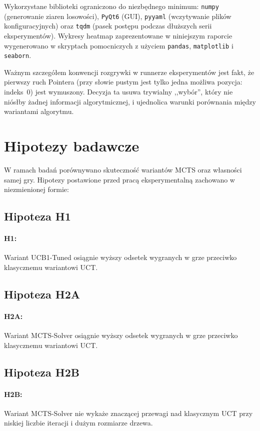 \documentclass{article}
\begin{document}
Wykorzystane biblioteki ograniczono do niezbędnego minimum: \texttt{numpy}
(generowanie ziaren losowości), \texttt{PyQt6} (GUI), \texttt{pyyaml}
(wczytywanie plików konfiguracyjnych) oraz \texttt{tqdm} (pasek postępu
podczas dłuższych serii eksperymentów). Wykresy heatmap zaprezentowane
w niniejszym raporcie wygenerowano w skryptach pomocniczych z użyciem
\texttt{pandas}, \texttt{matplotlib} i \texttt{seaborn}.

Ważnym szczegółem konwencji rozgrywki w runnerze eksperymentów jest fakt,
że pierwszy ruch Pointera (przy słowie pustym jest tylko jedna możliwa
pozycja: indeks~0) jest wymuszony. Decyzja ta usuwa trywialny ,,wybór'',
który nie niósłby żadnej informacji algorytmicznej, i ujednolica warunki
porównania między wariantami algorytmu.

\section{Hipotezy badawcze}

W ramach badań porównywano skuteczność wariantów MCTS oraz własności samej
gry. Hipotezy postawione przed pracą eksperymentalną zachowano
w niezmienionej formie:

\subsection*{Hipoteza H1}
\paragraph{H1:} Wariant UCB1-Tuned osiągnie wyższy odsetek wygranych
w grze przeciwko klasycznemu wariantowi UCT.

\subsection*{Hipoteza H2A}
\paragraph{H2A:} Wariant MCTS-Solver osiągnie wyższy odsetek wygranych
w grze przeciwko klasycznemu wariantowi UCT.

\subsection*{Hipoteza H2B}
\paragraph{H2B:} Wariant MCTS-Solver nie wykaże znaczącej przewagi nad
klasycznym UCT przy niskiej liczbie iteracji i dużym rozmiarze drzewa.
\end{document}
